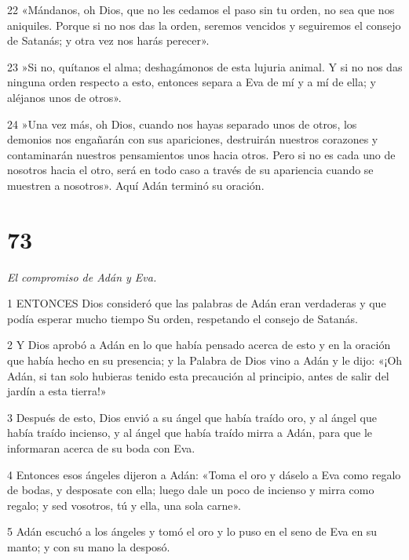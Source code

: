 \par 22 «Mándanos, oh Dios, que no les cedamos el paso sin tu orden, no sea que nos aniquiles. Porque si no nos das la orden, seremos vencidos y seguiremos el consejo de Satanás; y otra vez nos harás perecer».

\par 23 »Si no, quítanos el alma; deshagámonos de esta lujuria animal. Y si no nos das ninguna orden respecto a esto, entonces separa a Eva de mí y a mí de ella; y aléjanos unos de otros».

\par 24 »Una vez más, oh Dios, cuando nos hayas separado unos de otros, los demonios nos engañarán con sus apariciones, destruirán nuestros corazones y contaminarán nuestros pensamientos unos hacia otros. Pero si no es cada uno de nosotros hacia el otro, será en todo caso a través de su apariencia cuando se muestren a nosotros». Aquí Adán terminó su oración.

\chapter{73}

\par \textit{El compromiso de Adán y Eva.}

\par 1 ENTONCES Dios consideró que las palabras de Adán eran verdaderas y que podía esperar mucho tiempo Su orden, respetando el consejo de Satanás.

\par 2 Y Dios aprobó a Adán en lo que había pensado acerca de esto y en la oración que había hecho en su presencia; y la Palabra de Dios vino a Adán y le dijo: «¡Oh Adán, si tan solo hubieras tenido esta precaución al principio, antes de salir del jardín a esta tierra!»

\par 3 Después de esto, Dios envió a su ángel que había traído oro, y al ángel que había traído incienso, y al ángel que había traído mirra a Adán, para que le informaran acerca de su boda con Eva.

\par 4 Entonces esos ángeles dijeron a Adán: «Toma el oro y dáselo a Eva como regalo de bodas, y desposate con ella; luego dale un poco de incienso y mirra como regalo; y sed vosotros, tú y ella, una sola carne».

\par 5 Adán escuchó a los ángeles y tomó el oro y lo puso en el seno de Eva en su manto; y con su mano la desposó.

